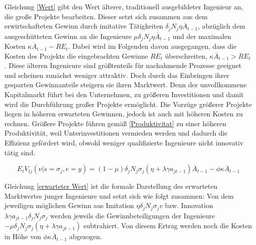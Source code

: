 Gleichung \eqref{Wert} gibt den Wert älterer, traditionell ausgebildeter Ingenieur an, die gro{\ss}e Projekte bearbeiten. Dieser setzt sich zusammen aus dem erwirtschafteten Gewinn durch imitative Tätigkeiten $\delta_j N_j \eta\overline{A}_{t-1}$, abzüglich dem ausgeschütteten Gewinn an die Ingenieure $\mu\delta_j N_j \eta\overline{A}_{t-1}$ und der maximalen Kosten $\kappa\overline{A}_{t-1}-RE_t$. Dabei wird im Folgenden davon ausgegangen, dass die Kosten des Projekts die eingebrachten Gewinne $RE_t$ überschreiten, $\kappa\overline{A}_{t-1}>RE_t$. Diese älteren Ingenieure sind grö{\ss}tenteils für nachahmende Prozesse geeignet und scheinen zunächst weniger attraktiv. Doch durch das Einbringen ihrer gesparten Gewinnanteile steigern sie ihren Marktwert. Denn der unvollkommene Kapitalmarkt führt bei den Unternehmen, zu grö{\ss}eren Investitionen und damit wird die Durchführung gro{\ss}er Projekte ermöglicht. Die Vorzüge grö{\ss}erer Projekte liegen in höheren erwarteten Gewinnen, jedoch ist auch mit höheren Kosten zu rechnen. Grö{\ss}ere Projekte führen gemä{\ss} \eqref{Produktivitat} zu einer höheren Produktivität, weil Unterinvestitionen vermieden werden und dadurch die Effizienz gefördert wird, obwohl weniger qualifizierte Ingenieure nicht innovativ tätig sind. 


	\begin{equation}
		E_tV_{tj} (\nu|s=\sigma_j,e=y)=(1-\mu)\delta_j N_j\sigma_j(\eta +\lambda\gamma a_{j t-1})\overline{A}_{t-1}-\phi\kappa\overline{A}_{t-1}\label{erwarteter Wert}
	\end{equation}

Gleichung \eqref{erwarteter Wert} ist die formale Darstellung des erwarteten Marktwertes junger Ingenieure und setzt sich wie folgt zusammen: 
Von dem jeweiligen möglichen Gewinn aus Imitation $\eta\delta_j N_j\sigma_jv$ bzw. Innovation $\lambda\gamma a_{j t-1}\delta_j N_j\sigma_j$ werden jeweils die Gewinnbeteiligungen der Ingenieure $-\mu\delta_j N_j\sigma_j(\eta +\lambda\gamma a_{j t-1})$ subtrahiert. Von diesem Ertrag werden noch die Kosten in Höhe von $\phi\kappa\overline{A}_{t-1}$ abgezogen. 

